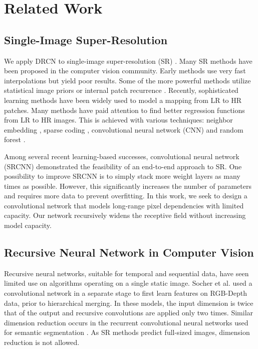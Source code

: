 \documentclass[10pt,twocolumn,letterpaper]{article}
\begin{document}
\section{Related Work}

\subsection{Single-Image Super-Resolution}

We apply DRCN to single-image super-resolution (SR) \cite{Irani1991, freeman2000learning,glasner2009super}. Many SR methods have been proposed in the computer vision community. Early methods use very fast interpolations but yield poor results. Some of the more powerful methods utilize statistical image priors \cite{sun2008image,Kim2010} or internal patch recurrence \cite{glasner2009super, Huang-CVPR-2015}. Recently, sophisticated learning methods have been widely used to model a mapping from LR to HR patches. Many methods have paid attention to find better regression functions from LR to HR images. This is achieved with various techniques: neighbor embedding \cite{chang2004super,bevilacqua2012}, sparse coding \cite{yang2010image,zeyde2012single,Timofte2013,Timofte}, convolutional neural network (CNN) \cite{dong2014image} and random forest \cite{schulter2015fast}.

Among several recent learning-based successes,  convolutional neural network (SRCNN) \cite{dong2014image} demonstrated the feasibility of an end-to-end approach to SR. One possibility to improve SRCNN is to simply stack more weight layers as many times as possible. However, this significantly increases the number of parameters and requires more data to prevent overfitting. In this work, we seek to design a convolutional network that models long-range pixel dependencies with limited capacity. Our network recursively widens the receptive field without increasing model capacity. 

\subsection{Recursive Neural Network in Computer Vision}

Recursive neural networks, suitable for temporal and sequential data, have seen limited use on algorithms operating on a single static image.   Socher et al.  \cite{socher2012convolutional} used a convolutional network in a separate stage to first learn features on RGB-Depth data, prior to hierarchical merging. In these models, the input dimension is twice that of the output and recursive convolutions are applied only two times. Similar dimension reduction occurs in the recurrent convolutional neural networks used for semantic segmentation \cite{pinheiro2014recurrent}. As SR methods predict full-sized images, dimension reduction is not allowed.
\end{document}
